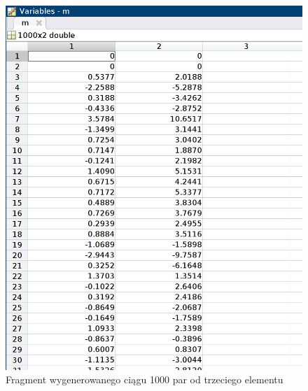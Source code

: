 \documentclass[12pt]{article}
\begin{document}
\begin{figure}[H]
    \centering
    \includegraphics[scale=0.3]{generowanie_danych_dane.png}
    \caption{Fragment wygenerowanego ciągu 1000 par od trzeciego elementu}
    \label{generowanie_danych_dane}
\end{figure}
\end{document}
